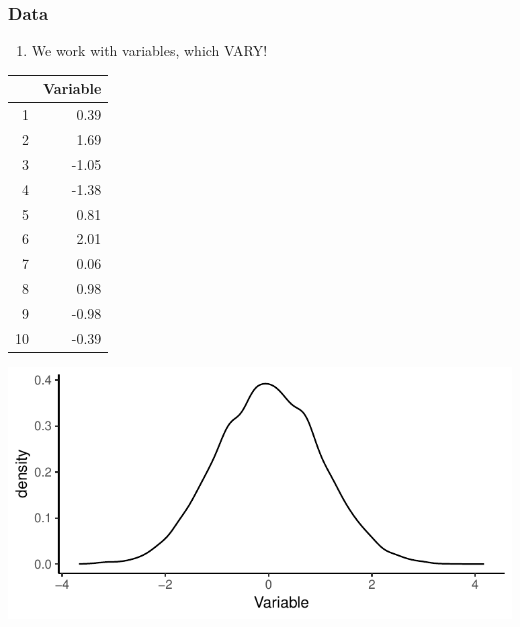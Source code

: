 \documentclass[xcolor=x11names,compress]{beamer}\usepackage[]{graphicx}\usepackage[]{color}
\makeatletter
\def\maxwidth{ %
  \ifdim\Gin@nat@width>\linewidth
    \linewidth
  \else
    \Gin@nat@width
  \fi
}
\newenvironment{knitrout}{}{} %
\renewcommand{\(}{\begin{columns}}
\renewcommand{\)}{\end{columns}}
\newcommand{\<}[1]{\begin{column}{#1}}
\renewcommand{\>}{\end{column}}
\makeatother
\begin{document}
\begin{frame}
\frametitle{Data}
\begin{enumerate}
\item We work with variables, which VARY!
\end{enumerate}
\begin{multicols}{2}
\begin{table}[ht]
\centering
\begin{tabular}{rr}
  \hline
 & Variable \\ 
  \hline
1 & 0.39 \\ 
  2 & 1.69 \\ 
  3 & -1.05 \\ 
  4 & -1.38 \\ 
  5 & 0.81 \\ 
  6 & 2.01 \\ 
  7 & 0.06 \\ 
  8 & 0.98 \\ 
  9 & -0.98 \\ 
  10 & -0.39 \\ 
   \hline
\end{tabular}
\end{table}

\columnbreak
\begin{knitrout}
\color{fgcolor}
\includegraphics[width=\maxwidth]{figure/var2-1} 

\end{knitrout}
\end{multicols}
\end{frame}

\end{document}
